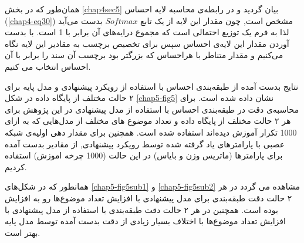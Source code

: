 همان‌طور که در بخش 
\ref{chap4sec5}
بیان گردید و در رابطه‌ی محاسبه لایه احساس (\ref{chap4-eq30}) مشخص است, چون مقدار این لایه از یک تابع 
$Softmax$
بدست می‌آید لذا به فرم یک توزیع احتمالی است که مجموع درایه‌های آن برابر با 1 است. با بدست آوردن مقدار این لایه‌ی احساس سپس برای تخصیص برچسب به مقادیر این لایه نگاه می‌کنیم و مقدار متناطر با هراحساس که بزرگتر بود برچسب آن سند را برابر با آن احساس انتخاب می کنیم.

نتایج بدست آمده از طبقه‌بندی احساس با استفاده از رویکرد پیشنهادی و مدل پایه برای ۲ حالت مختلف از پایگاه داده‌ در شکل
\ref{chap5-fig5}
نشان داده شده است. برای محاسبه‌ی دقت در طبقه‌بندی احساس با استفاده از مدل پیشنهادی در این پژوهش برای هر ۲ حالت مختلف از پایگاه داده و تعداد موضوع های مختلف از مدل‌هایی که به ازای 1000 تکرار آموزش دیده‌اند استفاده شده است. همچنین برای مقدار دهی اولیه‌ی شبکه عصبی با پارامترهای یاد گرفته شده توسط رویکرد پیشنهادی, از مقادیر بدست آمده برای پارامترها (ماتریس وزن و بایاس) در این حالت (1000 چرخه اموزش) استفاده کردیم.

همانطور که در شکل‌های 
\ref{chap5-fig5sub1}
و
\ref{chap5-fig5sub2}
مشاهده می گردد در هر ۲ حالت دقت طبقه‌بندی برای مدل پیشنهادی با افزایش تعداد موضوع‌ها رو به افزایش بوده است. همچنین در هر ۲ حالت دقت طبقه‌بندی با استفاده از مدل پیشنهادی با افزایش تعداد موضوع‌ها با اختلاف بسيار زیادی از دقت بدست آمده توسط مدل ‌پایه بهتر است. 

